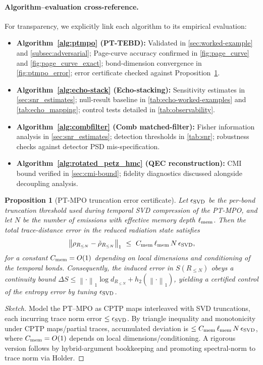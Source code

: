 \documentclass[a4paper,11pt]{article}
\newcommand{\ellmem}{\ensuremath{\ell_{\mathrm{mem}}}}
\theoremstyle{plain}
\newtheorem{proposition}{Proposition}
\theoremstyle{definition}
\theoremstyle{remark}
\begin{document}
\paragraph{Algorithm--evaluation cross-reference.}
For transparency, we explicitly link each algorithm to its empirical evaluation:
\begin{itemize}[leftmargin=*,itemsep=0.2em]
  \item \textbf{Algorithm~\ref{alg:ptmpo} (PT-TEBD):} Validated in \cref{sec:worked-example} and \cref{subsec:adversarial}; Page-curve accuracy confirmed in \cref{fig:page_curve} and \cref{fig:page_curve_exact}; bond-dimension convergence in \cref{fig:ptmpo_error}; error certificate checked against Proposition~\ref{prop:error}.
  \item \textbf{Algorithm~\ref{alg:echo-stack} (Echo-stacking):} Sensitivity estimates in \cref{sec:snr_estimates}; null-result baseline in \cref{tab:echo-worked-examples} and \cref{tab:echo_mapping}; control tests detailed in \cref{tab:observability}.
  \item \textbf{Algorithm~\ref{alg:combfilter} (Comb matched-filter):} Fisher information analysis in \cref{sec:snr_estimates}; detection thresholds in \cref{tab:snr}; robustness checks against detector PSD mis-specification.
  \item \textbf{Algorithm~\ref{alg:rotated_petz_hmc} (QEC reconstruction):} CMI bound verified in \cref{sec:cmi-bound}; fidelity diagnostics discussed alongside decoupling analysis.
\end{itemize}

\begin{proposition}[PT-MPO truncation error certificate]\label{prop:error}
Let $\epsilon_{\rm SVD}$ be the per-bond truncation threshold used during temporal SVD compression of the PT-MPO, and let $N$ be the number of emissions with effective memory depth $\ell_{\rm mem}$. Then the total trace-distance error in the reduced radiation state satisfies
\[
\left\|\rho_{R_{\le N}} - \tilde{\rho}_{R_{\le N}}\right\|_1 \ \le\ C_{\rm mem}\, \ell_{\rm mem}\, N\, \epsilon_{\rm SVD},
\]
for a constant $C_{\rm mem}=O(1)$ depending on local dimensions and conditioning of the temporal bonds. Consequently, the induced error in $S(R_{\le N})$ obeys a continuity bound $\Delta S \le \left\|\cdot\right\|_1 \log d_{R_{\le N}}+h_2(\left\|\cdot\right\|_1)$, yielding a certified control of the entropy error by tuning $\epsilon_{\rm SVD}$.
\end{proposition}
\begin{proof}[Sketch]
Model the PT--MPO as CPTP maps interleaved with SVD truncations, each incurring trace norm error $\le \epsilon_{\rm SVD}$. By triangle inequality and monotonicity under CPTP maps/partial traces, accumulated deviation is $\le C_{\rm mem}\,\ellmem\,N\,\epsilon_{\rm SVD}$, where $C_{\rm mem}=O(1)$ depends on local dimensions/conditioning. A rigorous version follows by hybrid-argument bookkeeping and promoting spectral-norm to trace norm via Holder.
\end{proof}
\end{document}
